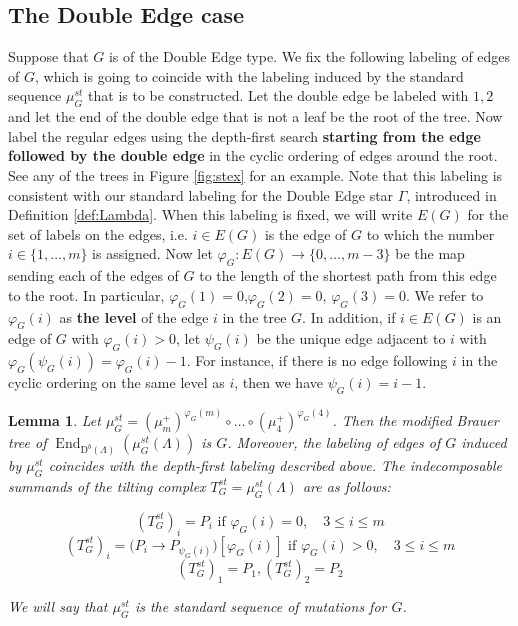 \documentclass[12pt]{amsart}
\theoremstyle{plain}
\newtheorem{lemma}{Lemma}%
\theoremstyle{remark}
\theoremstyle{definition}
\newcommand{\End}{\mathop{\mathrm{End}}\nolimits}
\newcommand{\D}{{\mathrm{D}}}
\begin{document}
 \subsection{The Double Edge case}
 Suppose that $G$ is of the Double Edge type. We fix the following labeling of edges of $G$, which is going to coincide with the labeling induced by the standard sequence $\mu_G^{st}$ that is to be constructed. Let the double edge be labeled with $1, 2$ and let the end of the double edge that is not a leaf be the root of the tree. Now label the regular edges using the depth-first search {\bf starting from the edge followed by the double edge} in the cyclic ordering of edges around the root. See any of the trees in Figure \ref{fig:stex} for an example. Note that this labeling is consistent with our standard labeling for the Double Edge star $\Gamma$, introduced in Definition \ref{def:Lambda}. When this labeling is fixed, we will write $E(G)$ for the set of labels on the edges, i.e. $i \in E(G)$ is the edge of $G$ to which the number $i \in \{1, \dots, m\}$ is assigned. Now let ${\varphi_G \colon E(G) \to \{0, \dots, m-3\}}$ be the map sending each of the edges of $G$ to the length of the shortest path from this edge to the root. In particular, $\varphi_G(1) = 0$,$\varphi_G(2) = 0$, $\varphi_G(3) = 0$. We refer to $\varphi_G(i)$ as {\bf the level} of the edge $i$ in the tree $G$. In addition, if $i \in E(G)$ is an edge of $G$ with $\varphi_G(i) > 0$, let $\psi_G(i)$ be the unique edge adjacent to $i$ with $\varphi_G(\psi_G(i)) = \varphi_G(i) - 1$. For instance, if there is no edge following $i$ in the cyclic ordering on the same level as $i$, then we have $\psi_G(i) = i-1$.  
 
 \begin{lemma}\label{thm:steared} Let $\mu_G^{st} = (\mu^+_m)^{\varphi_G(m)} \circ \dots \circ (\mu^+_4)^{\varphi_G(4)}$. Then the modified Brauer tree of $\End_{\D^b(\Lambda)}(\mu_G^{st}(\Lambda))$ is $G$. Moreover, the labeling of edges of $G$ induced by $\mu_G^{st}$ coincides with the depth-first labeling described above. The indecomposable summands of the tilting complex $T^{st}_G = \mu_G^{st}(\Lambda)$ are as follows: 
 
 $$ (T_G^{st})_i = P_i \text{ if } \varphi_G(i) = 0, \quad 3 \leq i \leq m $$
$$ (T_G^{st})_i = \big(P_i \to P_{\psi_G(i)}\big)[\varphi_G(i)] \text{ if } \varphi_G(i) > 0, \quad 3 \leq i \leq m $$
$$(T_G^{st})_1 = P_{1}, (T_G^{st})_2 = P_{2}$$

We will say that $\mu_G^{st}$ is the standard sequence of mutations for $G$. 

  \end{lemma} 
  
\end{document}
